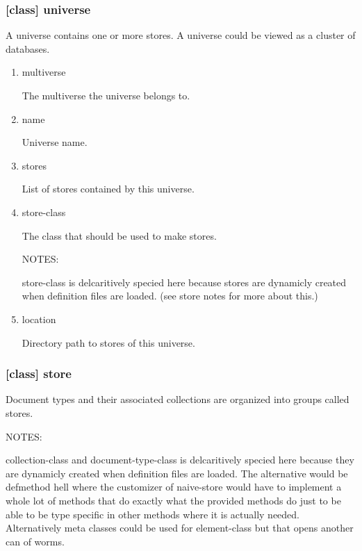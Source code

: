 \documentclass[11pt]{article}
\begin{document}
\subsubsection{[class] universe}
\label{sec:org4c0d04e}

A universe contains one or more stores. A universe could be viewed as
a cluster of databases.

\begin{enumerate}
\item\relax [accessor] multiverse
\label{sec:org50ab24a}

The multiverse the universe belongs to.

\item\relax [accessor] name
\label{sec:orgea73418}

Universe name.

\item\relax [accessor] stores
\label{sec:org6566afd}

List of stores contained by this universe.

\item\relax [accessor] store-class
\label{sec:orge6015fa}

The class that should be used to make stores.

NOTES:

store-class is delcaritively specied here because stores are dynamicly
created when definition files are loaded. (see store notes for more
about this.)

\item\relax [accessor] location
\label{sec:orgd065645}

Directory path to stores of this universe.
\end{enumerate}

\subsubsection{[class] store}
\label{sec:orgbe5530f}

Document types and their associated collections are organized into
groups called stores.

NOTES:

collection-class and document-type-class is delcaritively specied here
because they are dynamicly created when definition files are
loaded. The alternative would be defmethod hell where the customizer
of naive-store would have to implement a whole lot of methods that do
exactly what the provided methods do just to be able to be type
specific in other methods where it is actually needed. Alternatively
meta classes could be used for element-class but that opens another
can of worms.
\end{document}
